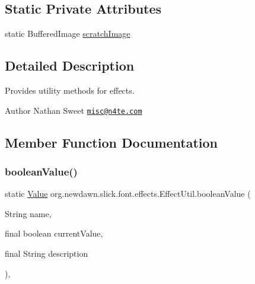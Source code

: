 \subsection*{Static Private Attributes}
\begin{DoxyCompactItemize}
\item 
static Buffered\+Image \mbox{\hyperlink{classorg_1_1newdawn_1_1slick_1_1font_1_1effects_1_1_effect_util_ae765205c4bea974106e097078f83cb6b}{scratch\+Image}}
\end{DoxyCompactItemize}


\subsection{Detailed Description}
Provides utility methods for effects.

\begin{DoxyAuthor}{Author}
Nathan Sweet \href{mailto:misc@n4te.com}{\tt misc@n4te.\+com} 
\end{DoxyAuthor}


\subsection{Member Function Documentation}
\mbox{\label{classorg_1_1newdawn_1_1slick_1_1font_1_1effects_1_1_effect_util_a7e64605c76343d015b84deed524683e8}} 
\subsubsection{\texorpdfstring{boolean\+Value()}{booleanValue()}}
{\footnotesize\ttfamily static \mbox{\hyperlink{interfaceorg_1_1newdawn_1_1slick_1_1font_1_1effects_1_1_configurable_effect_1_1_value}{Value}} org.\+newdawn.\+slick.\+font.\+effects.\+Effect\+Util.\+boolean\+Value (\begin{DoxyParamCaption}\item[{String}]{name,  }\item[{final boolean}]{current\+Value,  }\item[{final String}]{description }\end{DoxyParamCaption})\hspace{0.3cm}{\ttfamily [inline]}, {\ttfamily [static]}}


